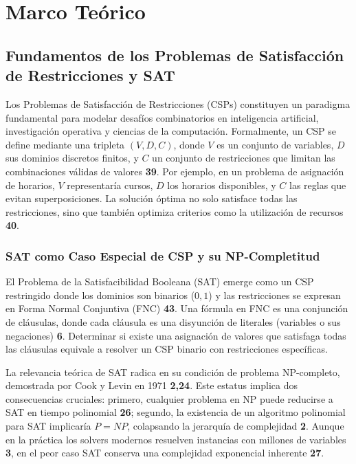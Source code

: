 \chapter{Marco Teórico}\label{chapter:state-of-the-art}

\section{Fundamentos de los Problemas de Satisfacción de Restricciones y SAT}
\label{sec:fundamentos-sat-csp}

Los Problemas de Satisfacción de Restricciones (CSPs) constituyen un paradigma fundamental para modelar desafíos combinatorios en inteligencia artificial, investigación operativa y ciencias de la computación. Formalmente, un CSP se define mediante una tripleta $(V,D,C)$, donde $V$ es un conjunto de variables, $D$ sus dominios discretos finitos, y $C$ un conjunto de restricciones que limitan las combinaciones válidas de valores \textbf{39}. Por ejemplo, en un problema de asignación de horarios, $V$ representaría cursos, $D$ los horarios disponibles, y $C$ las reglas que evitan superposiciones. La solución óptima no solo satisface todas las restricciones, sino que también optimiza criterios como la utilización de recursos \textbf{40}.

\subsection{SAT como Caso Especial de CSP y su NP-Completitud}
El Problema de la Satisfacibilidad Booleana (SAT) emerge como un CSP restringido donde los dominios son binarios (${0,1}$) y las restricciones se expresan en Forma Normal Conjuntiva (FNC) \textbf{43}. Una fórmula en FNC es una conjunción de cláusulas, donde cada cláusula es una disyunción de literales (variables o sus negaciones) \textbf{6}. Determinar si existe una asignación de valores que satisfaga todas las cláusulas equivale a resolver un CSP binario con restricciones específicas.

La relevancia teórica de SAT radica en su condición de problema NP-completo, demostrada por Cook y Levin en 1971 \textbf{2,24}. Este estatus implica dos consecuencias cruciales: primero, cualquier problema en NP puede reducirse a SAT en tiempo polinomial \textbf{26}; segundo, la existencia de un algoritmo polinomial para SAT implicaría $P=NP$, colapsando la jerarquía de complejidad \textbf{2}. Aunque en la práctica los solvers modernos resuelven instancias con millones de variables \textbf{3}, en el peor caso SAT conserva una complejidad exponencial inherente \textbf{27}.

